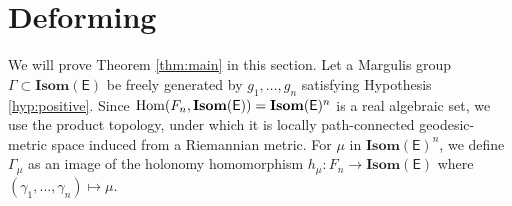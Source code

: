 \documentclass{amsart}
\numberwithin{equation}{section}
\newcommand\bR{{\mathbb{R}}}
\newcommand\vecu{\mathbbm{u}}
\newcommand{\vecw}{\mathbbm{w}}
\newcommand\Hom{{\rm Hom}}
\newcommand\ra{\rightarrow}
\newcommand\Isom{{\mathbf{Isom}}}
\newcommand\Ss{{\mathbb{S}}}
\newcommand\Lspace{\mathsf E}
\newtheorem{proposition}[theorem]{Proposition}
\theoremstyle{definition}
\theoremstyle{remark}
\begin{document}



\section{Deforming} \label{sec:deforming} 

We will prove Theorem \ref{thm:main} in this section. 
Let a Margulis group $\Gamma \subset \Isom(\Lspace)$ be 
freely generated by $g_1, \dots, g_n$ satisfying Hypothesis \ref{hyp:positive}.
Since $\Hom(F_n, \Isom(\Lspace)) = \Isom(\Lspace)^n$ is a real algebraic set, 
we use the product topology, 
under which it is locally path-connected geodesic-metric 
space induced from a Riemannian metric.  For $\mu$ in $\Isom(\Lspace)^n$,  
we define $\Gamma_\mu$ as an image of the holonomy 
homomorphism $h_\mu: F_n \ra \Isom(\Lspace)$
where $(\gamma_1, \dots, \gamma_n) \mapsto \mu$. 
\end{document}
